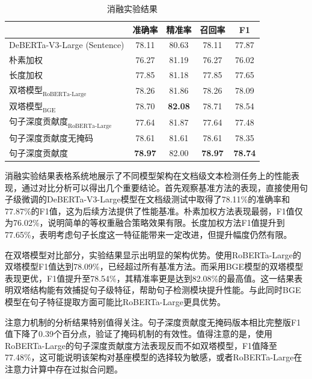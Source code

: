 \begin{table}[htbp]
\centering
\caption{消融实验结果}
\label{tab:ablative-result}
\begin{tabular}{l|cccc}
\toprule
                           & \textbf{准确率}   & \textbf{精准率}   & \textbf{召回率}   & \textbf{F1}    \\ \midrule
DeBERTa-V3-Large \cite{he2023debertav3improvingdebertausing} (Sentence) & 78.11          & 80.63          & 78.11          & 77.87          \\
朴素加权                        & 76.27          & 81.19          & 76.27          & 76.02          \\
长度加权                        & 77.85          & 81.18          & 77.85          & 77.65          \\ \midrule
$\text{双塔模型}_\text{RoBERTa-Large}$ & 78.26          & 81.86          & 78.26          & 78.09          \\
$\text{双塔模型}_\text{BGE}$          & 78.70          & \textbf{82.08} & 78.71          & 78.54          \\
$\text{句子深度贡献度}_\text{RoBERTa-Large}$ & 77.64          & 81.87          & 77.64          & 77.48          \\
句子深度贡献度无掩码            & 78.61          & 81.61          & 78.61          & 78.35          \\ \midrule
句子深度贡献度                  & \textbf{78.97} & 82.00          & \textbf{78.97} & \textbf{78.74} \\ \bottomrule
\end{tabular}
\end{table}

消融实验结果表格系统地展示了不同模型架构在文档级文本检测任务上的性能表现，通过对比分析可以得出几个重要结论。首先观察基准方法的表现，直接使用句子级微调的DeBERTa-V3-Large模型在文档级测试中取得了78.11\%的准确率和77.87\%的F1值，这为后续方法提供了性能基准。朴素加权方法表现最弱，F1值仅为76.02\%，说明简单的等权重融合策略效果有限。长度加权方法F1值提升到77.65\%，表明考虑句子长度这一特征能带来一定改进，但提升幅度仍然有限。

在双塔模型对比部分，实验结果显示出明显的架构优势。使用RoBERTa-Large的双塔模型F1值达到78.09\%，已经超过所有基准方法。而采用BGE模型的双塔模型表现更优，F1值提升至78.54\%，其精准率更是达到82.08\%的最高值。这一结果表明双塔结构能有效捕捉句子级特征，帮助句子检测模块提升性能。与此同时BGE模型在句子特征提取方面可能比RoBERTa-Large更具优势。

注意力机制的分析结果特别值得关注。句子深度贡献度无掩码版本相比完整版F1值下降了0.39个百分点，验证了掩码机制的有效性。值得注意的是，使用RoBERTa-Large的句子深度贡献度方法表现反而不如双塔模型，F1值降至77.48\%，这可能说明该架构对基座模型的选择较为敏感，或者RoBERTa-Large在注意力计算中存在过拟合问题。

